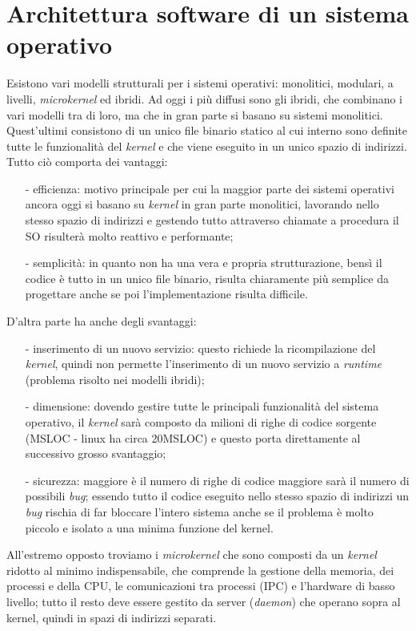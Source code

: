 \section{Architettura software di un sistema operativo}
Esistono vari modelli strutturali per i sistemi operativi: monolitici, modulari, a livelli, \textit{microkernel} ed ibridi. Ad oggi i più diffusi sono gli ibridi, che combinano i vari modelli tra di loro, ma che in gran parte si basano su sistemi monolitici. Quest'ultimi consistono di un unico file binario statico al cui interno sono definite tutte le funzionalità del \textit{kernel} e che viene eseguito in un unico spazio di indirizzi. Tutto ciò comporta dei vantaggi: 
\begin{itemize}
	\item[-] efficienza: motivo principale per cui la maggior parte dei sistemi operativi ancora oggi si basano su \textit{kernel} in gran parte monolitici, lavorando nello stesso spazio di indirizzi e gestendo tutto attraverso chiamate a procedura il SO risulterà molto reattivo e performante;
	\item[-] semplicità: in quanto non ha una vera e  propria strutturazione, bensì il codice è tutto in un unico file binario, risulta chiaramente più semplice da progettare anche se poi l'implementazione risulta difficile.
\end{itemize} 
D'altra parte ha anche degli svantaggi: 
\begin{itemize}
	\item[-] inserimento di un nuovo servizio: questo richiede la ricompilazione del \textit{kernel}, quindi non permette l'inserimento di un nuovo servizio a \textit{runtime} (problema risolto nei modelli ibridi);
	\item[-] dimensione: dovendo gestire tutte le principali funzionalità del sistema operativo, il \textit{kernel} sarà composto da milioni di righe di codice sorgente (MSLOC - linux ha circa 20MSLOC) e questo porta direttamente al successivo grosso svantaggio;
	\item[-] sicurezza: maggiore è il numero di righe di codice maggiore sarà il numero di possibili \textit{bug}; essendo tutto il codice eseguito nello stesso spazio di indirizzi un \textit{bug} rischia di far bloccare l'intero sistema anche se il problema è molto piccolo e isolato a una minima funzione del kernel.
\end{itemize}

All'estremo opposto troviamo i \textit{microkernel} che sono composti da un \textit{kernel} ridotto al minimo indispensabile, che comprende la gestione della memoria, dei processi e della CPU, le comunicazioni tra processi (IPC) e l'hardware di basso livello; tutto il resto deve essere gestito da server (\textit{daemon}) che operano sopra al kernel, quindi in spazi di indirizzi separati.

